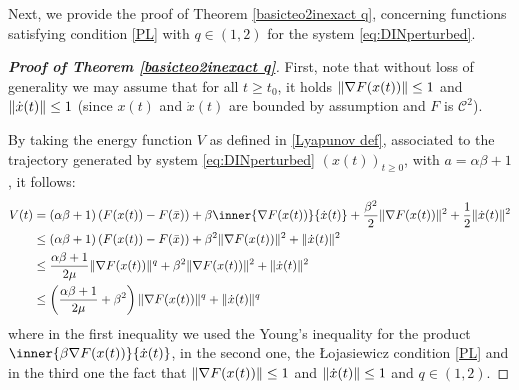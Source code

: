 \documentclass[reqno]{amsart}
\theoremstyle{plain}
\theoremstyle{definition}
\theoremstyle{remark}
\DeclarePairedDelimiter{\norm}{\lVert}{\rVert}	%
\newcommand{\Cb}{\mathcal{C}}
\begin{document}
Next, we provide the proof of Theorem \ref{basicteo2inexact q}, concerning functions satisfying condition \ref{PL} with $q\in(1,2)$ for the system \eqref{eq:DINperturbed}.

\begin{proof}[\textbf{Proof of Theorem \ref{basicteo2inexact q}}]
	
	
	
	First, note that without loss of generality we may assume that for all $t\geq t_{0}$, it holds $\norm{\nabla F(x(t))}\leq 1$ and $\norm{\dot{x}(t)}\leq 1$ (since $x(t)$ and $\dot{x}(t)$ are bounded by assumption and $F$ is $\Cb^{2}$). 
	
	
	By taking the energy function $V$ as defined in \eqref{Lyapunov def}, associated to the trajectory generated by system \eqref{eq:DINperturbed} $(x(t))_{t\geq 0}$, with $a=\alpha\beta+1$, it follows:
	\begin{equation}
		\begin{aligned}
			V(t) & = \left(\alpha\beta+1\right)\left(F(x(t))-F(\bar{x})\right) +\beta\inner{\nabla F(x(t))}{\dot{x}(t)}+\frac{\beta^{2}}{2}\norm{\nabla F(x(t))}^{2}+\frac{1}{2}\norm{\dot{x}(t)}^{2} \\
			& \leq \left(\alpha\beta+1\right)\left(F(x(t))-F(\bar{x})\right) +\beta^{2}\norm{\nabla F(x(t))}^{2}+\norm{\dot{x}(t)}^{2} \\
			& \leq \frac{\alpha\beta+1}{2\mu}\norm{\nabla F(x(t))}^{q}  +\beta^{2}\norm{\nabla F(x(t))}^{2}+\norm{\dot{x}(t)}^{2}\\
			&\leq \left(\frac{\alpha\beta+1}{2\mu}+\beta^{2}\right)\norm{\nabla F(x(t))}^{q} +\norm{\dot{x}(t)}^{q}
		\end{aligned}
	\end{equation}
	where in the first inequality we used the Young's inequality for the product $\inner{\beta\nabla F(x(t))}{\dot{x}(t)}$, in the second one, the \L ojasiewicz condition \ref{PL} and in the third one the fact that $\norm{\nabla F(x(t))}\leq 1$ and $\norm{\dot{x}(t)}\leq 1$ and $q\in (1,2)$. 
	

\end{proof}
\end{document}
